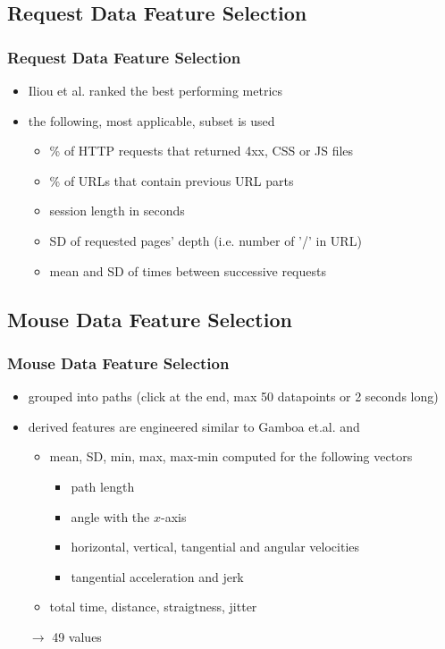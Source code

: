 \documentclass[t,aspectratio=169,table]{beamer}
\begin{document}
\subsection{Request Data Feature Selection}
\begin{frame}
\frametitle{Request Data Feature Selection}

\begin{itemize}
    \item Iliou et al. \cite{10.1145/3339252.3339267} ranked the best performing metrics
    \item the following, most applicable, subset is used
    \begin{itemize}
        \item \% of HTTP requests that returned 4xx, CSS or JS files
        \item \% of URLs that contain previous URL parts
        \item session length in seconds
        \item SD of requested pages' depth (i.e. number of '/' in URL)
        \item mean and SD of times between successive requests
    \end{itemize}
\end{itemize}

\end{frame}

\subsection{Mouse Data Feature Selection}
\begin{frame}
\frametitle{Mouse Data Feature Selection}

\begin{itemize}
    \item grouped into paths (click at the end, max 50 datapoints or 2 seconds long)
    \item derived features are engineered similar to Gamboa et.al.\cite{GAMBOA2004} and \cite{https://doi.org/10.1049/iet-bmt.2018.5126}
    \begin{itemize}
        \item mean, SD, min, max, max-min computed for the following vectors
        \begin{itemize}
            \item path length
            \item angle with the $x$-axis
            \item horizontal, vertical, tangential and angular velocities
            \item tangential acceleration and jerk
        \end{itemize}
        \item total time, distance, straigtness, jitter \\
    \end{itemize}
    $\rightarrow$ 49 values
\end{itemize}

\end{frame}
\end{document}
